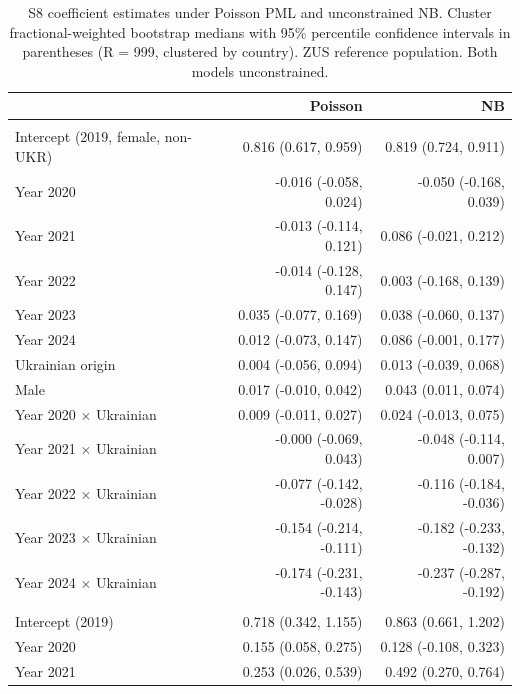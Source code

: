 \begin{table}[ht!]
\caption{\label{tbl-coefficients-appendix}S8 coefficient estimates under Poisson PML and unconstrained NB. Cluster fractional-weighted bootstrap medians with 95\% percentile confidence intervals in parentheses (R = 999, clustered by country). ZUS reference population. Both models unconstrained.} 
\fontsize{8.0pt}{10.0pt}\selectfont
\begin{tabular*}{\linewidth}{@{\extracolsep{\fill}}lrr}
\toprule
 & Poisson & NB \\ 
\midrule\addlinespace[2.5pt]
\multicolumn{3}{l}{Community anchor ($\hat{\alpha}$)} \\[2.5pt] 
\midrule\addlinespace[2.5pt]
Intercept (2019, female, non-UKR) & 0.816 (0.617, 0.959) & 0.819 (0.724, 0.911) \\ 
Year 2020 & -0.016 (-0.058, 0.024) & -0.050 (-0.168, 0.039) \\ 
Year 2021 & -0.013 (-0.114, 0.121) & 0.086 (-0.021, 0.212) \\ 
Year 2022 & -0.014 (-0.128, 0.147) & 0.003 (-0.168, 0.139) \\ 
Year 2023 & 0.035 (-0.077, 0.169) & 0.038 (-0.060, 0.137) \\ 
Year 2024 & 0.012 (-0.073, 0.147) & 0.086 (-0.001, 0.177) \\ 
Ukrainian origin & 0.004 (-0.056, 0.094) & 0.013 (-0.039, 0.068) \\ 
Male & 0.017 (-0.010, 0.042) & 0.043 (0.011, 0.074) \\ 
Year 2020 $\times$ Ukrainian & 0.009 (-0.011, 0.027) & 0.024 (-0.013, 0.075) \\ 
Year 2021 $\times$ Ukrainian & -0.000 (-0.069, 0.043) & -0.048 (-0.114, 0.007) \\ 
Year 2022 $\times$ Ukrainian & -0.077 (-0.142, -0.028) & -0.116 (-0.184, -0.036) \\ 
Year 2023 $\times$ Ukrainian & -0.154 (-0.214, -0.111) & -0.182 (-0.233, -0.132) \\ 
Year 2024 $\times$ Ukrainian & -0.174 (-0.231, -0.143) & -0.237 (-0.287, -0.192) \\ 
\midrule\addlinespace[2.5pt]
\multicolumn{3}{l}{Exposure elasticity ($\hat{\beta}$)} \\[2.5pt] 
\midrule\addlinespace[2.5pt]
Intercept (2019) & 0.718 (0.342, 1.155) & 0.863 (0.661, 1.202) \\ 
Year 2020 & 0.155 (0.058, 0.275) & 0.128 (-0.108, 0.323) \\ 
Year 2021 & 0.253 (0.026, 0.539) & 0.492 (0.270, 0.764) \\ 

\end{tabular*}
\end{table}
